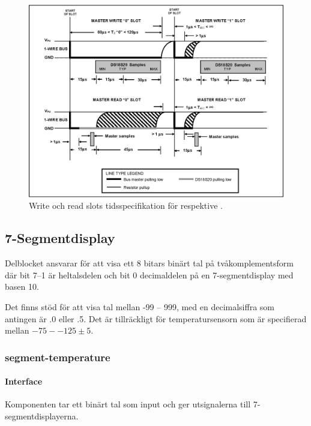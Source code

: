 \begin{figure}
\centering
\includegraphics[width=\textwidth]{write_slot.eps}
\caption{Write och read slots tidsspecifikation för \low{} respektive \high{}.}
\label{fig:rwslots}
\end{figure}



\subsection{7-Segmentdisplay}\label{sec:7seg}
Delblocket ansvarar för att visa ett 8 bitars binärt tal på tvåkomplementsform där bit 7--1 är heltalsdelen och bit 0 decimaldelen på en 7-segmentdisplay med basen 10.

Det finns stöd för att visa tal mellan -99 -- 999, med en decimalsiffra som antingen är .0 eller .5. Det är tillräckligt för temperatursensorn som är specifierad mellan $-75 -- 125 \pm5$.
\subsubsection{segment-temperature}

\paragraph{Interface}
Komponenten tar ett binärt tal som input och ger utsignalerna till 7-segmentdisplayerna.


